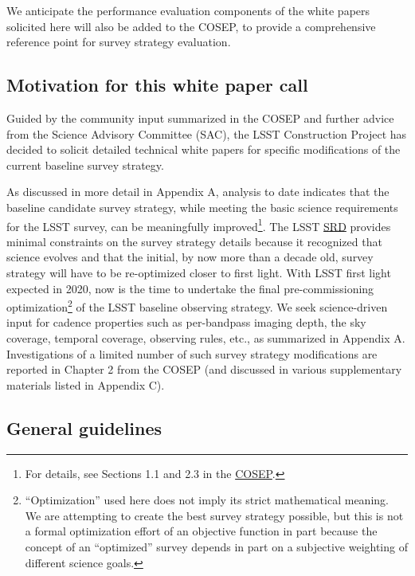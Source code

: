 \documentclass[DM,lsstdraft,toc,usenatbib]{lsstdoc}
\begin{document}
We anticipate the performance evaluation components of the white papers solicited here will also be added to the COSEP, to
provide a comprehensive reference point for survey strategy evaluation. 

\subsection{Motivation for this white paper call}

Guided by the community input summarized in the COSEP and further 
advice from the Science Advisory Committee (SAC), the LSST Construction Project has decided to
solicit detailed technical white papers for specific modifications of the current baseline survey strategy.

As discussed in more detail in Appendix A, analysis to date indicates that the baseline candidate
survey strategy, while meeting the basic science requirements for the LSST survey, can be meaningfully 
improved\footnote{For details, see Sections 1.1 
and 2.3 in the \href{http://ls.st/o5k}{COSEP}.}. The LSST \href{http://ls.st/srd}{SRD}
provides minimal constraints on the survey strategy details because it recognized that science evolves and that the 
initial, by now more than a decade old, survey strategy will have to be re-optimized closer to first 
light. With LSST first light expected in 2020, now is the time to undertake the final pre-commissioning
optimization\footnote{``Optimization'' used here does not imply its strict mathematical meaning. 
We are attempting to create the best survey strategy possible, but this is not a formal optimization 
effort of an objective function in part because the concept of an ``optimized'' survey depends in part on a subjective
weighting of different science goals.} 
of the LSST baseline observing strategy. We seek science-driven input for cadence 
properties such as per-bandpass imaging depth, the sky coverage, temporal coverage, observing
rules, etc., as summarized in Appendix A. Investigations of a limited number of such survey strategy 
modifications are reported in Chapter 2 from the COSEP (and discussed 
in various supplementary materials listed in Appendix C). 


\subsection{General guidelines} 
\end{document}
